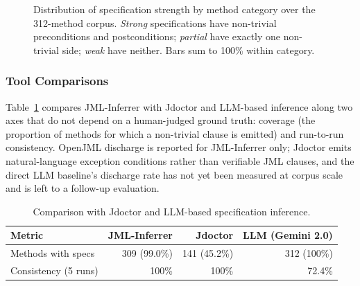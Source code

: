 \begin{figure}[ht]
\centering
{}
\caption{Distribution of specification strength by method category over the 312-method corpus. \emph{Strong} specifications have non-trivial preconditions and postconditions; \emph{partial} have exactly one non-trivial side; \emph{weak} have neither. Bars sum to 100\% within category.}
\label{fig:spec-strength}
\end{figure}

\subsubsection{Tool Comparisons}

Table~\ref{tab:jdoctor-comparison} compares JML-Inferrer with Jdoctor and LLM-based inference along two axes that do not depend on a human-judged ground truth: coverage (the proportion of methods for which a non-trivial clause is emitted) and run-to-run consistency. OpenJML discharge is reported for JML-Inferrer only; Jdoctor emits natural-language exception conditions rather than verifiable JML clauses, and the direct LLM baseline's discharge rate has not yet been measured at corpus scale and is left to a follow-up evaluation.

\begin{table}[ht]
\centering
\caption{Comparison with Jdoctor and LLM-based specification inference.}
\label{tab:jdoctor-comparison}
\small
\begin{tabular}{lrrr}
\toprule
\textbf{Metric} & \textbf{JML-Inferrer} & \textbf{Jdoctor} & \textbf{LLM (Gemini 2.0)} \\
\midrule
Methods with specs   & 309 (99.0\%) & 141 (45.2\%) & 312 (100\%) \\
Consistency (5 runs) & 100\%        & 100\%        & 72.4\% \\
\bottomrule
\end{tabular}
\end{table}

